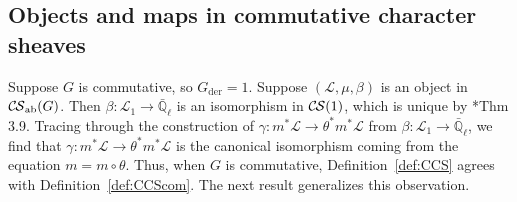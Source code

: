 \documentclass[10pt]{amsart}
\theoremstyle{plain}
\theoremstyle{definition}
\newcommand{\EE}{\mathbb{\bar Q}_\ell}
\DeclareMathOperator{\Loc}{Loc}
\newcommand{\der}{_{\operatorname{der}}}
\newcommand{\iso}{{\ \cong\ }}
\newcommand{\cs}[1]{{\mathcal{#1}}}
\newcommand{\CS}{{\mathcal{C\hskip-0.8pt S}}}
\newcommand{\CSab}{\CS_{\operatorname{ab}}}
\begin{document}


\subsection{Objects and maps in commutative character sheaves} \label{ssec:obmor}

Suppose $G$ is commutative, so $G\der = 1$. 
Suppose $(\cs{L},\mu,\beta)$ is an object in $\CSab(G)$.
Then $\beta : \cs{L}_1\to \EE$ is an isomorphism in $\CS(1)$, which is unique by \cite{cunningham-roe:13a}*{Thm 3.9}.
Tracing through the construction of $\gamma : m^*\cs{L} \to \theta^*m^*\cs{L}$ from $\beta : \cs{L}_1\to \EE$, we find 
that $\gamma : m^*\cs{L} \to \theta^*m^*\cs{L}$ is the canonical isomorphism coming from the equation $m = m \circ \theta$. 
Thus, when $G$ is commutative, Definition~\ref{def:CCS} agrees with Definition~\ref{def:CCScom}.
The next result generalizes this observation.
\end{document}
